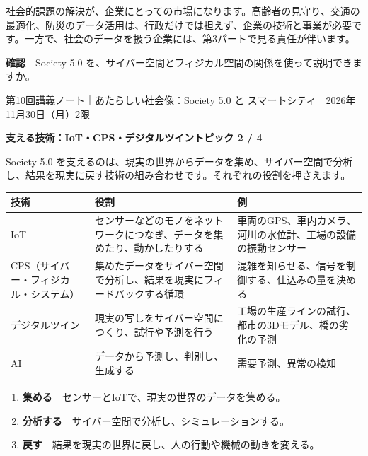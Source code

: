 \documentclass[paper=a4paper,fontsize=10pt,line_length=170mm,number_of_lines=46,baselineskip=1.6zw]{jlreq}
\newcommand\topichead[4]{%
  {\sffamily\footnotesize\color{grayt}#1\par}\vspace{1.5mm}
  {\sffamily\bfseries\LARGE #4}\hfill\colorbox{accent}{\sffamily\footnotesize\bfseries トピック #2 / #3}\par
  \vspace{1.2mm}{\color{ink}\hrule height 0.6pt}\vspace{3mm}}
\newcommand\subhead[1]{\par\vspace{2.6mm}{\sffamily\bfseries\large #1}\par\vspace{1.3mm}}
\begin{document}
\subhead{企業にとっての意味}
社会的課題の解決が、企業にとっての市場になります。高齢者の見守り、交通の最適化、防災のデータ活用は、行政だけでは担えず、企業の技術と事業が必要です。一方で、社会のデータを扱う企業には、第3パートで見る責任が伴います。\par\vspace{1.2mm}
\begin{checkbox}
{\sffamily\bfseries 確認}　Society 5.0 を、サイバー空間とフィジカル空間の関係を使って説明できますか。\par
\end{checkbox}
\clearpage
\topichead{第10回講義ノート｜あたらしい社会像：Society 5.0 と スマートシティ｜2026年11月30日（月）2限}{2}{4}{支える技術：IoT・CPS・デジタルツイン}
Society 5.0 を支えるのは、現実の世界からデータを集め、サイバー空間で分析し、結果を現実に戻す技術の組み合わせです。それぞれの役割を押さえます。\par\vspace{1.2mm}
\subhead{技術の役割}
\begin{center}\small\renewcommand{\arraystretch}{1.15}\setlength{\tabcolsep}{1.5mm}
\begin{tabular}{|p{24.0mm}|p{68.0mm}|p{68.0mm}|}\arrayrulecolor{rulec}\hline
\rowcolor{papertwo}\sffamily\bfseries 技術 & \sffamily\bfseries 役割 & \sffamily\bfseries 例\\\hline
IoT & センサーなどのモノをネットワークにつなぎ、データを集めたり、動かしたりする & 車両のGPS、車内カメラ、河川の水位計、工場の設備の振動センサー\\\hline
CPS（サイバー・フィジカル・システム） & 集めたデータをサイバー空間で分析し、結果を現実にフィードバックする循環 & 混雑を知らせる、信号を制御する、仕込みの量を決める\\\hline
デジタルツイン & 現実の写しをサイバー空間につくり、試行や予測を行う & 工場の生産ラインの試行、都市の3Dモデル、橋の劣化の予測\\\hline
AI & データから予測し、判別し、生成する & 需要予測、異常の検知\\\hline
\end{tabular}\end{center}\vspace{0.5mm}
\subhead{サイバー・フィジカル・システムの循環}
\begin{enumerate}[leftmargin=1.5em,itemsep=0.6mm,topsep=0.3mm]
\item {\sffamily\bfseries 集める}　センサーとIoTで、現実の世界のデータを集める。
\item {\sffamily\bfseries 分析する}　サイバー空間で分析し、シミュレーションする。
\item {\sffamily\bfseries 戻す}　結果を現実の世界に戻し、人の行動や機械の動きを変える。
\end{enumerate}\vspace{0.8mm}
\end{document}
